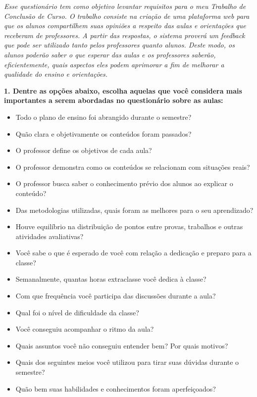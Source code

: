 \documentclass[
  12pt,       %
  openright,      %
  oneside,      %
  a4paper,      %
  english,      %
  french,        %
  spanish,     %
  brazil        %
  ]{abntex2-decsi}
\begin{document}
\begin{apendicesenv}
  	\textit{Esse questionário tem como objetivo levantar requisitos para o meu Trabalho de Conclusão de Curso. O trabalho consiste na criação de uma plataforma web para que os alunos compartilhem suas opiniões a respeito das aulas e orientações que receberam de professores. A partir das respostas, o sistema proverá um feedback que pode ser utilizado tanto pelos professores quanto alunos. Deste modo, os alunos poderão saber o que esperar das aulas e os professores saberão, eficientemente, quais aspectos eles podem aprimorar a fim de melhorar a qualidade do ensino e orientações.}
  
  	\textbf{1. Dentre as opções abaixo, escolha aquelas que você considera mais importantes a serem abordadas no questionário sobre as aulas:}
    
    \begin{itemize}[label=\Square]
        \item Todo o plano de ensino foi abrangido durante o semestre?
        \item Quão clara e objetivamente os conteúdos foram passados?
        \item O professor define os objetivos de cada aula?
        \item O professor demonstra como os conteúdos se relacionam com situações reais?
        \item O professor busca saber o conhecimento prévio dos alunos ao explicar o conteúdo?
        \item Das metodologias utilizadas, quais foram as melhores para o seu aprendizado?
        \item Houve equilíbrio na distribuição de pontos entre provas, trabalhos e outras atividades avaliativas?
        \item  Você sabe o que é esperado de você com relação a dedicação e preparo para a classe?
        \item Semanalmente, quantas horas extraclasse você dedica à classe?
        \item Com que frequência você participa das discussões durante a aula?
        \item Qual foi o nível de dificuldade da classe?
        \item Você conseguiu acompanhar o ritmo da aula?
        \item Quais assuntos você não conseguiu entender bem? Por quais motivos?
        \item Quais dos seguintes meios você utilizou para tirar suas dúvidas durante o semestre?
        \item Quão bem suas habilidades e conhecimentos foram aperfeiçoados?

\end{itemize}
\end{apendicesenv}
\end{document}
